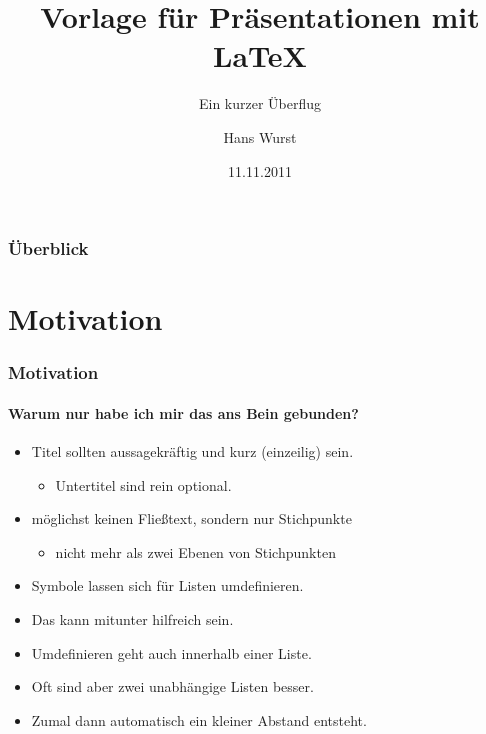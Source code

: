 \documentclass[utf8]{beamer}
\title[Präsentationen mit \LaTeX{}]{Vorlage für Präsentationen mit \LaTeX{}}
\subtitle[]{Ein kurzer Überflug}
\author[H. Wurst]{Hans Wurst}
\date{11.11.2011}
\institute[PC DC]{Physikalische Chemie und Didaktik der Chemie\\ Universität des Saarlandes}
\begin{document}
\begin{frame}[plain]
\titlepage
\end{frame}


\begin{frame}
\frametitle{Überblick}

\tableofcontents

\end{frame}


\section{Motivation}


\begin{frame}
\frametitle{Motivation}
\framesubtitle{Warum nur habe ich mir das ans Bein gebunden?}

\begin{itemize}
\item Titel sollten aussagekräftig und kurz (einzeilig) sein.
\begin{itemize}
\item Untertitel sind rein optional.
\end{itemize}

\item möglichst keinen Fließtext, sondern nur Stichpunkte
\begin{itemize}
\item nicht mehr als zwei Ebenen von Stichpunkten
\end{itemize}
\end{itemize}

\begin{itemize}
\item Symbole lassen sich für Listen umdefinieren.
\item Das kann mitunter hilfreich sein.
\item Umdefinieren geht auch innerhalb einer Liste.
\end{itemize}

\begin{itemize}
\item Oft sind aber zwei unabhängige Listen besser.
\item Zumal dann automatisch ein kleiner Abstand entsteht.
\end{itemize}

\end{frame}
\end{document}
